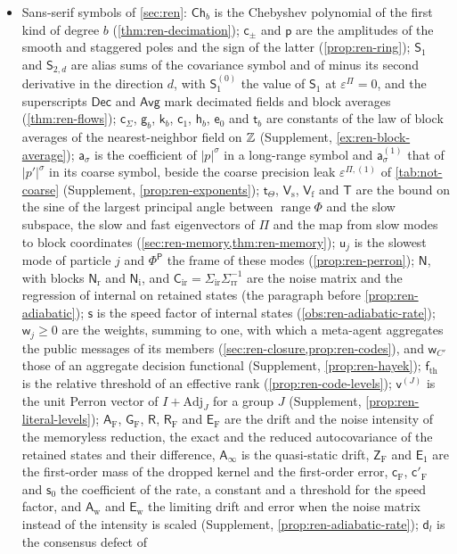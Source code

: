 \begin{itemize}
\item Sans-serif symbols of \cref{sec:ren}: $\mathsf{Ch}_b$ is the Chebyshev polynomial of the first kind of degree $b$ (\cref{thm:ren-decimation}); $\mathsf c_\pm$ and $\mathsf p$ are the amplitudes of the smooth and staggered poles and the sign of the latter (\cref{prop:ren-ring}); $\mathsf S_1$ and $\mathsf S_{2,d}$ are alias sums of the covariance symbol and of minus its second derivative in the direction $d$, with $\mathsf S^{(0)}_1$ the value of $\mathsf S_1$ at $\varepsilon^\Pi=0$, and the superscripts $\mathsf{Dec}$ and $\mathsf{Avg}$ mark decimated fields and block averages (\cref{thm:ren-flows}); $\mathsf c_\Sigma$, $\mathsf g_b$, $\mathsf k_b$, $\mathsf c_1$, $\mathsf h_b$, $\mathsf e_0$ and $\mathsf t_b$ are constants of the law of block averages of the nearest-neighbor field on $\mathbb{Z}$ (Supplement, \cref{ex:ren-block-average}); $\mathsf a_\sigma$ is the coefficient of $\lvert p\rvert^\sigma$ in a long-range symbol and $\mathsf a^{(1)}_\sigma$ that of $\lvert p'\rvert^\sigma$ in its coarse symbol, beside the coarse precision leak $\varepsilon^{\Pi,(1)}$ of \cref{tab:not-coarse} (Supplement, \cref{prop:ren-exponents}); $\mathsf t_\Theta$, $\mathsf V_{\mathrm s}$, $\mathsf V_{\mathrm f}$ and $\mathsf T$ are the bound on the sine of the largest principal angle between $\operatorname{range}\Phi$ and the slow subspace, the slow and fast eigenvectors of $\Pi$ and the map from slow modes to block coordinates (\cref{sec:ren-memory,thm:ren-memory}); $\mathsf u_j$ is the slowest mode of particle $j$ and $\Phi^{\mathsf P}$ the frame of these modes (\cref{prop:ren-perron}); $\mathsf N$, with blocks $\mathsf N_{\mathrm r}$ and $\mathsf N_{\mathrm i}$, and $\mathsf C_{\mathrm{ir}}=\Sigma_{\mathrm{ir}}\Sigma_{\mathrm{rr}}^{-1}$ are the noise matrix and the regression of internal on retained states (the paragraph before \cref{prop:ren-adiabatic}); $\mathsf s$ is the speed factor of internal states (\cref{obs:ren-adiabatic-rate}); $\mathsf w_j\ge0$ are the weights, summing to one, with which a meta-agent aggregates the public messages of its members (\cref{sec:ren-closure,prop:ren-codes}), and $\mathsf w_{C'}$ those of an aggregate decision functional (Supplement, \cref{prop:ren-hayek}); $\mathsf f_{\mathrm{th}}$ is the relative threshold of an effective rank (\cref{prop:ren-code-levels}); $\mathsf v^{(J)}$ is the unit Perron vector of $I+\mathrm{Adj}_J$ for a group $J$ (Supplement, \cref{prop:ren-literal-levels}); $\mathsf A_{\mathrm F}$, $\mathsf G_{\mathrm F}$, $\mathsf R$, $\mathsf R_{\mathrm F}$ and $\mathsf E_{\mathrm F}$ are the drift and the noise intensity of the memoryless reduction, the exact and the reduced autocovariance of the retained states and their difference, $\mathsf A_\infty$ is the quasi-static drift, $\mathsf Z_{\mathrm F}$ and $\mathsf E_1$ are the first-order mass of the dropped kernel and the first-order error, $\mathsf c_{\mathrm F}$, $\mathsf c'_{\mathrm F}$ and $\mathsf s_0$ the coefficient of the rate, a constant and a threshold for the speed factor, and $\mathsf A_{\mathrm w}$ and $\mathsf E_{\mathrm w}$ the limiting drift and error when the noise matrix instead of the intensity is scaled (Supplement, \cref{prop:ren-adiabatic-rate}); $\mathsf d_l$ is the consensus defect of 
\end{itemize}
